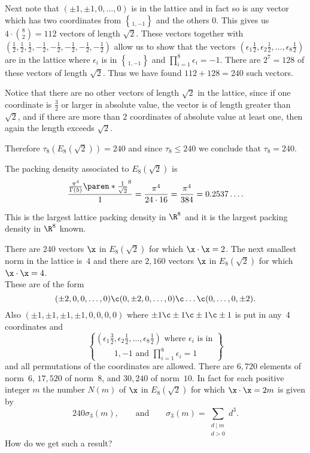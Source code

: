 Next note that $(\pm1,\pm1,0,\dotsc,0)$ is in the lattice and in fact so is any vector which has two coordinates from $\brace{1,-1}$ and the others $0$.  This gives us $4\cdot\binom82=112$ vectors of length $\sqrt2$.  These vectors together with $(\frac12,\frac12,\frac12,-\frac12,-\frac12,-\frac12,-\frac12,-\frac12)$ allow us to show that the vectors $(\epsilon_1\frac12,\epsilon_2\frac12,\dotsc,\epsilon_8\frac12)$ are in the lattice where $\epsilon_i$ is in $\brace{1,-1}$ and $\prod_{i=1}^8\epsilon_i=-1$.  There are $2^7=128$ of these vectors of length $\sqrt2$.  Thus we have found $112+128=240$ such vectors.

Notice that there are no other vectors of length $\sqrt2$ in the lattice, since if one coordinate is $\frac32$ or larger in absolute value, the vector is of length greater than $\sqrt2$, and if there are more than $2$ coordinates of absolute value at least one, then again the length exceeds $\sqrt2$.

Therefore $\tau_8(E_8(\sqrt2))=240$ and since $\tau_8\leq240$ we conclude that $\tau_8=240$.

The packing density associated to $E_8(\sqrt2)$ is
\[ \frac{\frac{\pi^4}{\Gamma(5)}\paren*{\frac{1}{\sqrt2}}^8}{1} = \frac{\pi^4}{24\cdot16} = \frac{\pi^4}{384} = 0.2537\ldots . \]

This is the largest lattice packing density in $\R^8$ and it is the largest packing density in $\R^8$ known.

There are 240 vectors $\x$ in $E_8(\sqrt2)$ for which $\x\cdot\x=2$.  The next smallest norm in the lattice is~$4$ and there are $2{,}160$ vectors $\x$ in $E_8(\sqrt2)$ for which $\x\cdot\x=4$. \\
These are of the form
\[ (\pm2,0,0,\dotsc,0)\c  (0,\pm2,0,\dotsc,0)\c  \dotsc\c  (0,\dotsc,0,\pm2) . \]
Also $(\pm1,\pm1,\pm1,\pm1,0,0,0,0)$ where $\pm1\c \pm1\c \pm1\c \pm1$ is put in any~4 coordinates and
\[ (\epsilon_1\tfrac32,\epsilon_2\tfrac12,\dotsc,\epsilon_8\tfrac12)\text{ where }\epsilon_i\text{ is in }\brace{1,-1}\text{ and }\prod_{i=1}^8\epsilon_i=1 \]
and all permutations of the coordinates are allowed.  There are $6{,}720$ elements of norm~$6$, $17{,}520$ of norm~$8$, and $30{,}240$ of norm~$10$.  In fact for each positive integer $m$ the number $N(m)$ of $\x$ in $E_8(\sqrt2)$ for which $\x\cdot\x=2m$ is given by
\[ 240\sigma_3(m), \qquad\text{and}\qquad \sigma_3(m)=\sum_{\substack{d\mid m\\d>0}}d^3 . \]
How do we get such a result?

